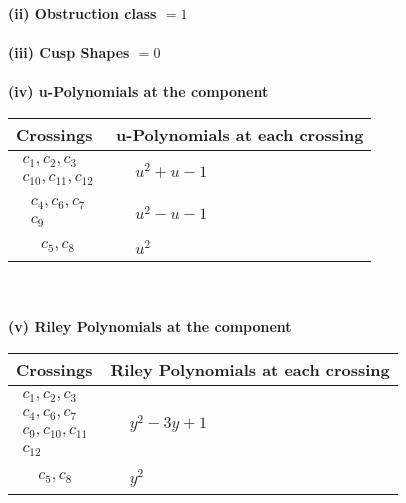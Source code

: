 \documentclass[1p]{elsarticle_modified}
\theoremstyle{definition}
\begin{document}
\flushleft \textbf{(ii) Obstruction class $= 1$}\\~\\
\flushleft \textbf{(iii) Cusp Shapes $= 0$}\\~\\
\newpage\renewcommand{\arraystretch}{1}
\flushleft \textbf{(iv) u-Polynomials at the component}\newline \\
\begin{tabular}{m{50pt}|m{274pt}}
Crossings & \hspace{64pt}u-Polynomials at each crossing \\
\hline $$\begin{aligned}c_{1},c_{2},c_{3}\\c_{10},c_{11},c_{12}\end{aligned}$$&$\begin{aligned}
&u^2+u-1
\end{aligned}$\\
\hline $$\begin{aligned}c_{4},c_{6},c_{7}\\c_{9}\end{aligned}$$&$\begin{aligned}
&u^2- u-1
\end{aligned}$\\
\hline $$\begin{aligned}c_{5},c_{8}\end{aligned}$$&$\begin{aligned}
&u^2
\end{aligned}$\\
\hline
\end{tabular}\\~\\
\newpage\renewcommand{\arraystretch}{1}
\flushleft \textbf{(v) Riley Polynomials at the component}\newline \\
\begin{tabular}{m{50pt}|m{274pt}}
Crossings & \hspace{64pt}Riley Polynomials at each crossing \\
\hline $$\begin{aligned}c_{1},c_{2},c_{3}\\c_{4},c_{6},c_{7}\\c_{9},c_{10},c_{11}\\c_{12}\end{aligned}$$&$\begin{aligned}
&y^2-3 y+1
\end{aligned}$\\
\hline $$\begin{aligned}c_{5},c_{8}\end{aligned}$$&$\begin{aligned}
&y^2
\end{aligned}$\\
\hline
\end{tabular}\\~\\
\end{document}
